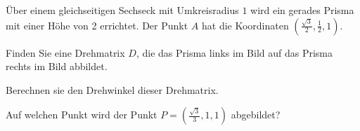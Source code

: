 Über einem gleichseitigen Sechseck mit Umkreisradius $1$ 
wird ein gerades Prisma mit einer Höhe von 2 errichtet.
Der Punkt $A$ hat die Koordinaten 
$\left(\frac{\sqrt{3}}{2},\frac{1}{2},1\right)$.

\begin{center}
\end{center}

\begin{teilaufgaben}
\item
Finden Sie eine Drehmatrix $D$, die das Prisma links im Bild auf das
Prisma rechts im Bild abbildet.
\item
Berechnen sie den Drehwinkel dieser Drehmatrix.
\item 
Auf welchen Punkt wird der Punkt $P=(\frac{\sqrt{3}}{3},1,1)$ abgebildet?
\end{teilaufgaben}


